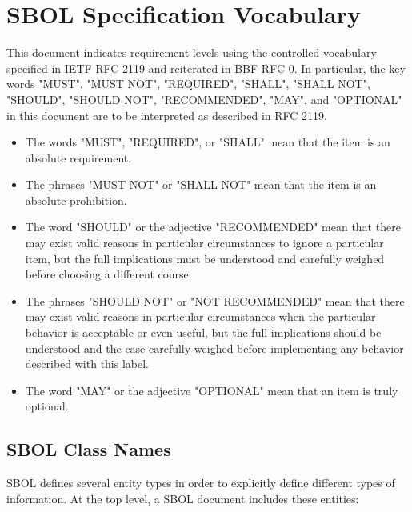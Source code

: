 \section{SBOL Specification Vocabulary}

This document indicates requirement levels using the controlled vocabulary specified in IETF RFC 2119 and reiterated in BBF RFC 0.
In particular, the key words "MUST", "MUST NOT", "REQUIRED", "SHALL", "SHALL NOT", "SHOULD", "SHOULD NOT", "RECOMMENDED", "MAY", and "OPTIONAL" in this document are to be interpreted as described in RFC 2119.

\begin{itemize}
\item The words "MUST", "REQUIRED", or "SHALL" mean that the item is an absolute requirement.
\item The phrases "MUST NOT" or "SHALL NOT" mean that the item is an absolute prohibition.
\item The word "SHOULD" or the adjective "RECOMMENDED" mean that there may exist valid reasons in particular circumstances to ignore a particular item, but the full implications must be understood and carefully weighed before choosing a different course.
\item The phrases "SHOULD NOT" or "NOT RECOMMENDED" mean that there may exist valid reasons in particular circumstances when the particular behavior is acceptable or even useful, but the full implications should be understood and the case carefully weighed before implementing any behavior described with this label.
\item The word "MAY" or the adjective "OPTIONAL" mean that an item is truly optional.
\end{itemize}

\subsection{SBOL Class Names}

SBOL defines several entity types in order to explicitly define different types of information. At the top level, a SBOL document includes these entities:

